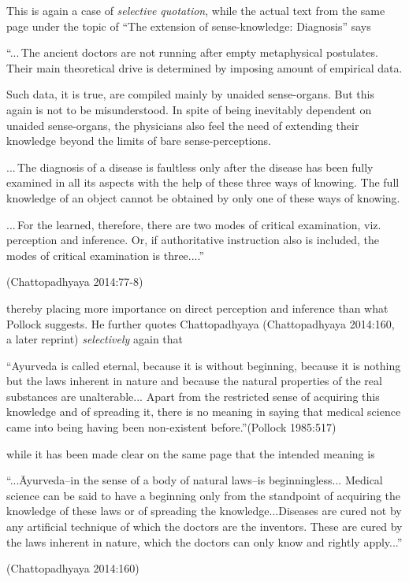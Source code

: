 This is again a case of {\sl selective quotation}, while the actual text from the same page under the topic of ``The extension of sense-knowledge: Diagnosis'' says 
\begin{myquote}
``...\,The ancient doctors are not running after empty metaphysical postulates. Their main theoretical drive is determined by imposing amount of empirical data. 

Such data, it is true, are compiled mainly by unaided sense-organs. But this again is not to be misunderstood. In spite of being inevitably dependent on unaided sense-organs, the physicians also feel the need of extending their knowledge beyond the limits of bare sense-perceptions.

...\,The diagnosis of a disease is faultless only after the disease has been fully examined in all its aspects with the help of these three ways of knowing. The full knowledge of an object cannot be obtained by only one of these ways of knowing.

...\,For the learned, therefore, there are two modes of critical examination, viz. perception and inference. Or, if authoritative instruction also is included, the modes of critical examination is three....'' 

\hfill (Chattopadhyaya 2014:77-8)
\end{myquote}
thereby placing more importance on direct perception and inference than what Pollock suggests. He further quotes Chattopadhyaya (Chattopadhyaya 2014:160, a later reprint) {\sl selectively} again that 
\begin{myquote}
``Ayurveda is called eternal, because it is without beginning, because it is nothing but the laws inherent in nature and because the natural properties of the real substances are unalterable... Apart from the restricted sense of acquiring this knowledge and of spreading it, there is no meaning in saying that medical science came into being having been non-existent before.''\hfill (Pollock 1985:517)
\end{myquote}
while it has been made clear on the same page that the intended meaning is

\begin{myquote}
``...Āyurveda--in the sense of a body of natural laws--is beginningless... Medical science can be said to have a beginning only from the standpoint of acquiring the knowledge of these laws or of spreading the knowledge...Diseases are cured not by any artiﬁcial technique of which the doctors are the inventors. These are cured by the laws inherent in nature, which the doctors can only know and rightly apply...'' 

\hfill (Chattopadhyaya 2014:160)
\end{myquote}

